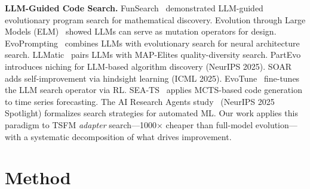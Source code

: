 \documentclass{article}
\begin{document}
\textbf{LLM-Guided Code Search.} FunSearch~\cite{romera2024funsearch} demonstrated LLM-guided evolutionary program search for mathematical discovery. Evolution through Large Models (ELM)~\cite{lehman2023elm} showed LLMs can serve as mutation operators for design. EvoPrompting~\cite{chen2023evoprompting} combines LLMs with evolutionary search for neural architecture search. LLMatic~\cite{nasir2024llmatic} pairs LLMs with MAP-Elites quality-diversity search. PartEvo~\cite{hu2025partevo} introduces niching for LLM-based algorithm discovery (NeurIPS 2025). SOAR~\cite{pourcel2025soar} adds self-improvement via hindsight learning (ICML 2025). EvoTune~\cite{surina2025evotune} fine-tunes the LLM search operator via RL. SEA-TS~\cite{xu2026seats} applies MCTS-based code generation to time series forecasting. The AI Research Agents study~\cite{toledo2025aiagents} (NeurIPS 2025 Spotlight) formalizes search strategies for automated ML. Our work applies this paradigm to TSFM \textit{adapter} search---1000$\times$ cheaper than full-model evolution---with a systematic decomposition of what drives improvement.

\section{Method}
\end{document}
